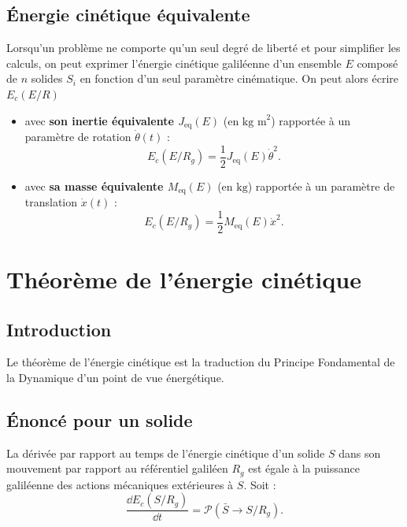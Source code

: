 \documentclass[10pt,fleqn]{article} %
\begin{document}
\subsection{Énergie cinétique équivalente}

\begin{defi}
Lorsqu'un problème ne comporte qu'un seul degré de liberté et pour simplifier les calculs, on peut exprimer l'énergie cinétique galiléenne d'un ensemble $E$ composé de $n$ solides $S_i$ en fonction d'un seul paramètre cinématique.
On peut alors écrire $E_c(E/R)$ 
\begin{itemize}
\item avec \textbf{son inertie équivalente $J_{\text{eq}}(E)$} (en $\text{kg m}^2$) rapportée à un paramètre de rotation $\dot{\theta}(t)$ : 
$$
E_c(E/R_g)=\frac{1}{2}J_{\text{eq}}(E) \dot{\theta}^2.
$$
\item avec \textbf{sa masse équivalente $M_{\text{eq}}(E)$} (en $\text{kg}$) rapportée à un paramètre de translation $\dot{x}(t)$ : 
$$
E_c(E/R_g)=\frac{1}{2}M_{\text{eq}}(E) \dot{x}^2.
$$
\end{itemize}
\end{defi}

\section{Théorème de l'énergie cinétique}
\subsection{Introduction}
Le théorème de l'énergie cinétique est la traduction du Principe Fondamental de la Dynamique d'un point de vue énergétique.
\subsection{Énoncé pour un solide}

\begin{theorem}
La dérivée par rapport au temps de l'énergie cinétique d'un solide $S$ dans son mouvement par rapport au référentiel galiléen $R_g$ est égale à la puissance galiléenne des actions mécaniques extérieures à $S$.
Soit :
$$
\dfrac{\dd E_c(S/R_g)}{\dd t}=\mathcal{P}(\bar S \rightarrow S/R_g).
$$

\end{theorem}


\end{document}
